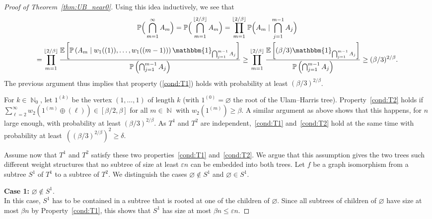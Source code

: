 \documentclass[11pt]{article}
\numberwithin{equation}{section}
\DeclareMathOperator{\N}{\mathbb{N}} %
\newcommand{\p}{\mathbb{P}} %
\newcommand{\E}{\mathbb{E}} %
\newcommand{\eps}{\varepsilon} %
\theoremstyle{definition}
\begin{document}
\begin{proof}[Proof of Theorem~\ref{thm:UB_near0}]
    Using this idea inductively, we see that 
    \begin{multline*}
        \p \Big( \bigcap_{m=1}^{\infty} A_{m} \Big) = 
        \p \Big( \bigcap_{m=1}^{\lfloor 2/\beta \rfloor} A_{m} \Big)
        =
        \prod_{m=1}^{\lfloor 2/\beta \rfloor}
        \p \Big(  A_{m} \mid \bigcap_{j=1}^{m-1} A_j \Big)
        \\
        =
        \prod_{m=1}^{\lfloor 2/\beta \rfloor}
        \frac{\E \left[ \p \left( A_{m} \mid w_1((1)),\ldots, w_1((m-1)) \right)  \mathbbm{1}_{\bigcap_{j=1}^{m-1} A_j}\right]}{\p \left( \bigcap_{j=1}^{m-1} A_j \right)}
        \geq
         \prod_{m=1}^{\lfloor 2/\beta \rfloor}
        \frac{\E \left[ (\beta/3)  \mathbbm{1}_{\bigcap_{j=1}^{m-1} A_j}\right]}{\p \left( \bigcap_{j=1}^{m-1} A_j \right)}
        \geq
        (\beta/3)^{2/\beta}.
    \end{multline*}
    The previous argument thus implies that property (\ref{cond:T1}) holds with probability at least $(\beta/3)^{2/\beta}$.

    For $k\in \N_0$, let $1^{(k)}$ be the vertex $(1,\ldots,1)$ of length $k$ (with $1^{(0)} = \varnothing$ the root of the Ulam--Harris tree). Property~\eqref{cond:T2} holds if $\sum_{\ell=2}^{\infty} w_2( 1^{(m)} \oplus ( \ell ) ) \in \left[ \beta/2,\beta \right]$ for all $m \in \N$ with  $w_{2}(1^{(m)}) \geq \beta$.  A similar argument as above shows that this happens, for $n$ large enough, with probability at least $(\beta/3)^{2/\beta}$.
    As $T^1$ and $T^2$ are independent,~\eqref{cond:T1} and~\eqref{cond:T2} hold at the same time with probability at least~$\left((\beta/3)^{2/\beta}\right)^2 \geq \delta$.

    \medskip


Assume now that  $T^1$ and $T^2$  satisfy these two properties~\eqref{cond:T1} and~\eqref{cond:T2}. We argue that this assumption gives the two trees such different weight structures that no subtree of size at least $\eps n$ can be embedded into both trees.  
Let $f$ be a graph isomorphism from a subtree $S^1$ of $T^1$ to a subtree of $T^2$. We distinguish the cases $\varnothing \notin S^1$ and $\varnothing \in S^1$.

\textbf{Case 1:} $\varnothing \notin S^1$.
\\
In this case, $S^1$ has to be contained in a subtree that is rooted at one of the children of $\varnothing$. Since all subtrees of children of $\varnothing$ have size at most $\beta n$ by Property~\eqref{cond:T1}, this shows that $S^1$ has size at most $\beta n \leq \eps n$.


\end{proof}
\end{document}
